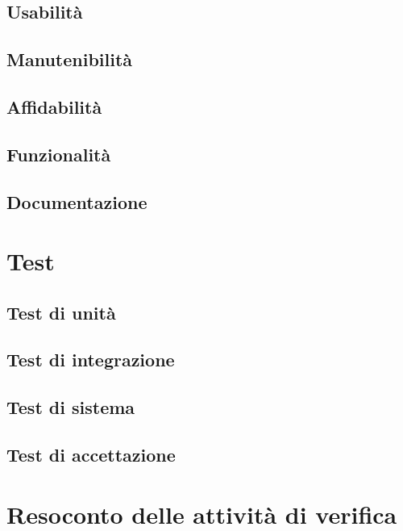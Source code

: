 \documentclass[a4paper, 11pt]{article}
\begin{document}
\subsection{Usabilità}
\subsection{Manutenibilità}
\subsection{Affidabilità}
\subsection{Funzionalità}
\subsection{Documentazione}

\pagebreak

\section{Test}
\subsection{Test di unità}
\subsection{Test di integrazione}
\subsection{Test di sistema}
\subsection{Test di accettazione}

\section{Resoconto delle attività di verifica}
\end{document}
